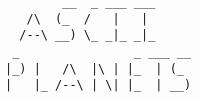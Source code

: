 \lstset{basicstyle=\ttfamily}
\begin{lstlisting}
        __  _ ___ ___
   /\  (_  /   |   |
  /--\ __) \_ _|_ _|_
 _                _ ___ __
|_) |   /\  |\ | |_  | (_
|   |_ /--\ | \| |_  | __)
\end{lstlisting}
